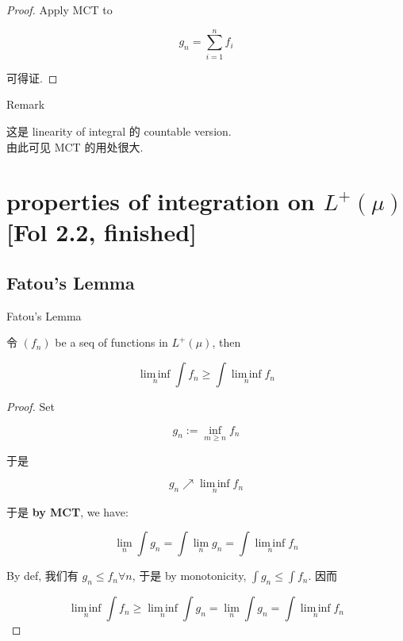 \documentclass{qlnotes-export}
\begin{document}
\begin{proof}

Apply MCT to

\[g_{n} = \sum\limits_{i = 1}^{n}f_{i}\]

可得证.

\end{proof}

\begin{qlremark}{Remark}

这是 linearity of integral 的 countable version.\\
由此可见 MCT 的用处很大.

\end{qlremark}

\section{\texorpdfstring{properties of integration on \(L^{+}(\mu)\) {[}Fol 2.2, finished{]}}{properties of integration on L\^{}\{+\}(\textbackslash mu) {[}Fol 2.2, finished{]}}}

\subsection{Fatou's Lemma}\label{fatous-lemma}

\begin{theorem}{Fatou's Lemma}\label{thm-04-measurable-functions-and-integration-on-l-mu-fatou-s-lemma}

令 \((f_{n})\) be a seq of functions in \(L^{+}(\mu)\), then

\[\operatorname{lim\, inf}\limits_{n}\int f_{n} \geq \int\operatorname{lim\, inf}\limits_{n}f_{n}\]

\end{theorem}

\begin{proof}

Set

\[g_{n} := \inf\limits_{m \geq n}f_{n}\]

于是

\[g_{n}\operatorname{\nearrow ︎}\operatorname{lim\, inf}\limits_{n}f_{n}\]

于是 \textbf{by MCT}, we have:

\[\lim\limits_{n}\int g_{n} = \int\lim\limits_{n}g_{n} = \int\operatorname{lim\, inf}\limits_{n}f_{n}\]

By def, 我们有 \(g_{n} \leq f_{n}\forall n\), 于是 by monotonicity, \(\int g_{n} \leq \int f_{n}\). 因而

\[\operatorname{lim\, inf}\limits_{n}\int f_{n} \geq \operatorname{lim\, inf}\limits_{n}\int g_{n} = \lim\limits_{n}\int g_{n} = \int\operatorname{lim\, inf}\limits_{n}f_{n}\]

\end{proof}
\end{document}

